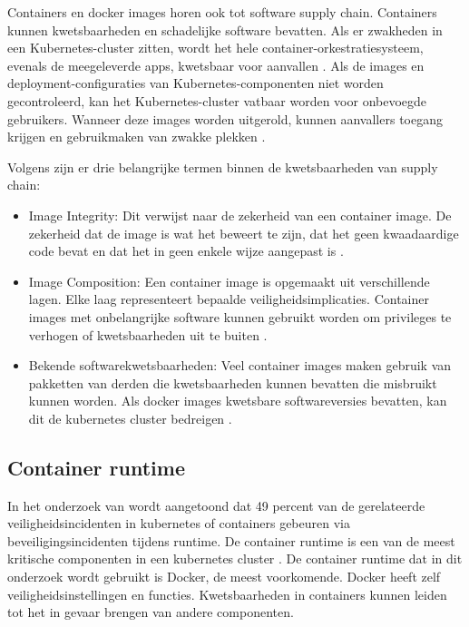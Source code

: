 Containers en docker images horen ook tot software supply chain. Containers kunnen kwetsbaarheden en schadelijke software bevatten. Als er zwakheden in een Kubernetes-cluster zitten, wordt het hele container-orkestratiesysteem, evenals de meegeleverde apps, kwetsbaar voor aanvallen \autocite{shamim2020xi}. Als de images en deployment-configuraties van Kubernetes-componenten niet worden gecontroleerd, kan het Kubernetes-cluster vatbaar worden voor onbevoegde gebruikers. Wanneer deze images worden uitgerold, kunnen aanvallers toegang krijgen en gebruikmaken van zwakke plekken \autocite{shamim2020xi}. \newline

Volgens \textcite{OWASP-2023} zijn er drie belangrijke termen binnen de kwetsbaarheden van supply chain:
\begin{itemize}
    \item Image Integrity: Dit verwijst naar de zekerheid van een container image. De zekerheid dat de image is wat het beweert te zijn, dat het geen kwaadaardige code bevat en dat het in geen enkele wijze aangepast is \autocite{OWASP-2023}. 
    \item Image Composition: Een container image is opgemaakt uit verschillende lagen. Elke laag representeert bepaalde veiligheidsimplicaties. Container images met onbelangrijke software kunnen gebruikt worden om privileges te verhogen of kwetsbaarheden uit te buiten \autocite{OWASP-2023}. 
    \item  Bekende softwarekwetsbaarheden: Veel container images maken gebruik van pakketten van derden die kwetsbaarheden kunnen bevatten die misbruikt kunnen worden. Als docker images kwetsbare softwareversies bevatten, kan dit de kubernetes cluster bedreigen \autocite{OWASP-2023}. 
\end{itemize}


\subsection{Container runtime}
In het onderzoek van \textcite{red-hat-2023} wordt aangetoond dat 49 percent van de gerelateerde veiligheidsincidenten in kubernetes of containers gebeuren via beveiligingsincidenten tijdens runtime. De container runtime is een van de meest kritische componenten in een kubernetes cluster \autocite{mytilinakis2020attack}. De container runtime dat in dit onderzoek wordt gebruikt is Docker, de meest voorkomende. Docker heeft zelf veiligheidsinstellingen en functies. Kwetsbaarheden in containers kunnen leiden tot het in gevaar brengen van andere componenten. 

